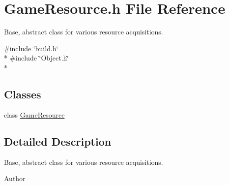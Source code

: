 \section{Game\-Resource.\-h File Reference}
\label{_game_resource_8h}


Base, abstract class for various resource acquisitions.  


{\ttfamily \#include \char`\"{}build.\-h\char`\"{}}\\*
{\ttfamily \#include \char`\"{}Object.\-h\char`\"{}}\\*
\subsection*{Classes}
\begin{DoxyCompactItemize}
\item 
class \hyperlink{class_game_resource}{Game\-Resource}
\end{DoxyCompactItemize}


\subsection{Detailed Description}
Base, abstract class for various resource acquisitions. \begin{DoxyAuthor}{Author}

\end{DoxyAuthor}
